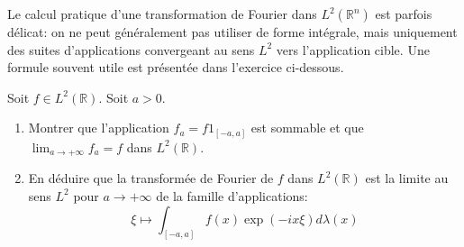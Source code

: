 Le calcul pratique d'une transformation de Fourier dans $L^2(\mathbb{R}^n)$ est
parfois délicat: on ne peut généralement pas utiliser de forme intégrale, mais
uniquement des suites d'applications convergeant au sens $L^2$ vers
l'application cible. 
Une formule souvent utile est présentée dans l'exercice ci-dessous.
\begin{exercice}
Soit $f \in L^2(\mathbb{R})$. Soit $a > 0$. 
\begin{enumerate}
  \item Montrer que l'application $f_a = f 1_{[-a,a]}$ est sommable et que
  $\lim_{a \to +\infty}f_a=f$ dans $ L^2(\mathbb{R})$.
  \item En déduire que la transformée de Fourier de $f$ dans $L^2(\mathbb{R})$
  est la limite au sens $L^2$ pour $a \to +\infty$ de la famille d'applications:
  \[
  \xi \mapsto \int_{[-a,a]} f(x) \exp(-ix\xi) d\lambda(x)
  \]
\end{enumerate}
\end{exercice}
